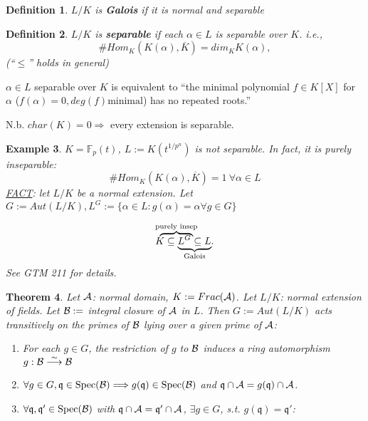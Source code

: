 \documentclass[11pt]{article}
\newtheorem{thm}{Theorem}[section]
\newtheorem{dfn}[thm]{Definition}
\newtheorem{ex}[thm]{Example}
\newcommand{\bbf}{\mathbb F}
\newcommand{\scq}{\mathfrak q}
\newcommand{\cala}{{\cal A}}
\newcommand{\calb}{{\cal B}}
\newcommand{\Lrta}{\Longrightarrow}
\newcommand{\lrta}{\longrightarrow}
\begin{document}
\begin{dfn}
$L/K$ is \textbf{Galois} if it is normal and separable
\end{dfn}

\begin{dfn}
$L/K$ is \textbf{separable} if each $\alpha\in L$ is separable over $K$. i.e.,
$$
\# Hom_K(K(\alpha),\overline{K})=dim_K K(\alpha),
$$
(``$\leq$'' holds in general)
\end{dfn}
$\alpha\in L$ separable over $K$ is equivalent to ``the minimal polynomial $f\in K[X]$ for $\alpha$ ($f(\alpha)=0, deg(f)\text{minimal}$) has no repeated roots.''

N.b. $char(K)=0\Lrta$ every extension is separable.

\begin{ex}
$K=\bbf_p(t)$, $L:=K(t^{1/p^n})$ is not separable. In fact, it is purely inseparable: 
$$
\#Hom_K(K(\alpha),\overline{K})=1\ \forall \alpha\in L
$$
\underline{FACT}: let $L/K$ be a normal extension. Let $G:=Aut(L/K), L^G:=\{\alpha\in L:g(\alpha)=\alpha\forall g\in G\}$

\[
      \mathrlap{\overbrace{\phantom{Kaa \subseteq\ }}^{\text{purely insep}}}
      K\subseteq 
      \mathrlap{\underbrace{\phantom{L^G\subseteq\ \ \    }}_{\text{Galois}}}
       L^G\subseteq L.
\]
See GTM 211 for details.
\end{ex}




\begin{thm}\label{thm:normal_domain_normal_Galois}
Let $\cala$: normal domain, $K:=Frac(\cala)$.
Let $L/K$: normal extension of fields. Let $\calb:=$ integral closure of $\cala$ in $L$. Then $G:=Aut(L/K)$ acts transitively on the primes of $\calb$ lying over a given prime of $\cala$:
\begin{enumerate}[label=(\roman*)]
\item For each $g\in G$, the restriction of $g$ to $\calb$ induces a ring automorphism $g:\calb\overset{\sim}{\lrta}\calb$

\item $\forall g\in G, \scq\in \text{Spec}(\calb)\Lrta g(\scq)\in \text{Spec}(\calb)$ and $\scq\cap\cala=g(\scq)\cap\cala$.

\item $\forall \scq,\scq'\in \text{Spec}(\calb)$ with $\scq\cap\cala=\scq'\cap\cala$, $\exists g\in G$, s.t. $g(\scq)=\scq'$:
\end{enumerate}
\end{thm}
\end{document}
